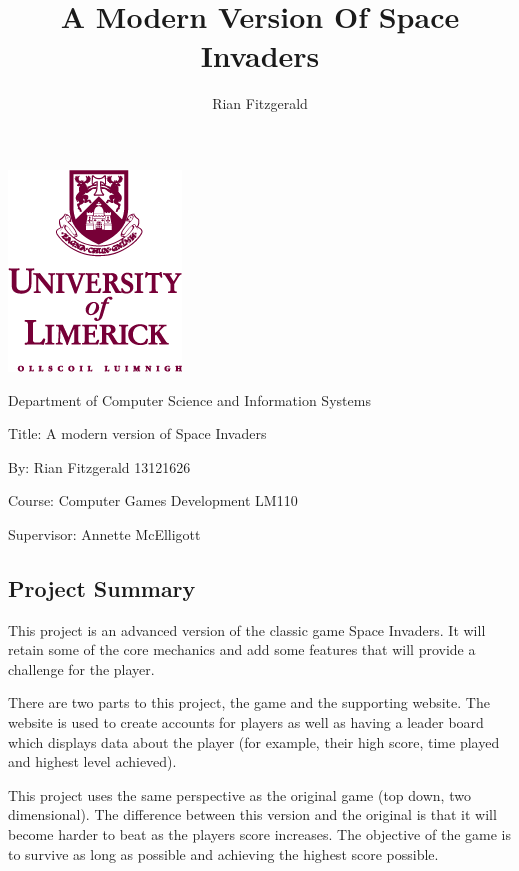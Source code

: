 \documentclass[12pt]{article}
\title{A Modern Version Of Space Invaders}
\author{Rian Fitzgerald}
\begin{document}
\newpage
\begin{center}
\section*{}
	\includegraphics[scale=1]{uni-limerick-crest.png}
	
	{\Large Department of Computer Science and Information Systems
	
	\vspace{5em}
	Title: A modern version of Space Invaders
	
	By: Rian Fitzgerald 13121626
	
	Course: Computer Games Development LM110
	
	Supervisor: Annette McElligott}
	
\end{center}
\newpage
{}
\begin{center}
\section*{Project Summary}
\end{center}
This project is an advanced version of the classic game Space Invaders. It will retain some of the core mechanics and add some features that will provide a challenge for the player. 

There are two parts to this project, the game and the supporting website. The website is used to create accounts for players as well as having a leader board which displays data about the player (for example, their high score, time played and highest level achieved). 

This project uses the same perspective as the original game (top down, two dimensional). The difference between this version and the original is that it will become harder to beat as the players score increases. The objective of the game is to survive as long as possible and achieving the highest score possible. 
\end{document}
